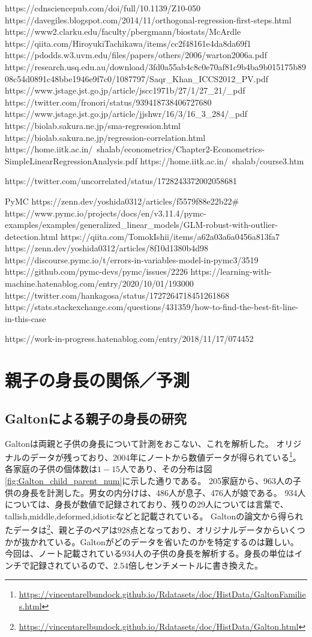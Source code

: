 https://cdnsciencepub.com/doi/full/10.1139/Z10-050
https://davegiles.blogspot.com/2014/11/orthogonal-regression-first-steps.html
https://www2.clarku.edu/faculty/pbergmann/biostats/McArdle%
https://qiita.com/HiroyukiTachikawa/items/cc2f48161e4da8da69f1
https://pdodds.w3.uvm.edu/files/papers/others/2006/warton2006a.pdf
https://research.usq.edu.au/download/3fd0a55ab4c8c0e70af81c9b4ba9b015175b8908c54d0891c48bbe1946e9f7c0/1087797/Saqr_Khan_ICCS2012_PV.pdf
https://www.jstage.jst.go.jp/article/jscc1971b/27/1/27_21/_pdf
https://twitter.com/fronori/status/939418738406727680
https://www.jstage.jst.go.jp/article/jjshwr/16/3/16_3_284/_pdf
https://biolab.sakura.ne.jp/sma-regression.html
https://biolab.sakura.ne.jp/regression-correlation.html
https://home.iitk.ac.in/~shalab/econometrics/Chapter2-Econometrics-SimpleLinearRegressionAnalysis.pdf
https://home.iitk.ac.in/~shalab/course3.htm



https://twitter.com/uncorrelated/status/1728243372002058681

PyMC
https://zenn.dev/yoshida0312/articles/f5579f88e22b22#%
https://www.pymc.io/projects/docs/en/v3.11.4/pymc-examples/examples/generalized_linear_models/GLM-robust-with-outlier-detection.html
https://qiita.com/TomokIshii/items/a62a03a6a0456a813fa7
https://zenn.dev/yoshida0312/articles/8f10d1380b4d98
https://discourse.pymc.io/t/errors-in-variables-model-in-pymc3/3519
https://github.com/pymc-devs/pymc/issues/2226
https://learning-with-machine.hatenablog.com/entry/2020/10/01/193000
https://twitter.com/hankagosa/status/1727264718451261868
https://stats.stackexchange.com/questions/431359/how-to-find-the-best-fit-line-in-this-case

https://work-in-progress.hatenablog.com/entry/2018/11/17/074452

\fi



\chapter{親子の身長の関係／予測}
\section{Galtonによる親子の身長の研究}
Galtonは両親と子供の身長について計測をおこない、これを解析した。
オリジナルのデータが残っており、2004年にノートから数値データが得られている\footnote{\url{https://vincentarelbundock.github.io/Rdatasets/doc/HistData/GaltonFamilies.html}}。
各家庭の子供の個体数は$1-15$人であり、その分布は図\ref{fig:Galton_child_parent_num}に示した通りである。
205家庭から、963人の子供の身長を計測した。男女の内分けは、486人が息子、476人が娘である。
934人については、身長が数値で記録されており、残りの29人については言葉で、tallish,middle,deformed,idioticなどと記載されている。
Galtonの論文から得られたデータは\footnote{\url{https://vincentarelbundock.github.io/Rdatasets/doc/HistData/Galton.html}}、親と子のペアは$928$点となっており、オリジナルデータからいくつかが抜かれている。Galtonがどのデータを省いたのかを特定するのは難しい。
今回は、ノート記載されている934人の子供の身長を解析する。身長の単位はインチで記録されているので、$2.54$倍しセンチメートルに書き換えた。

